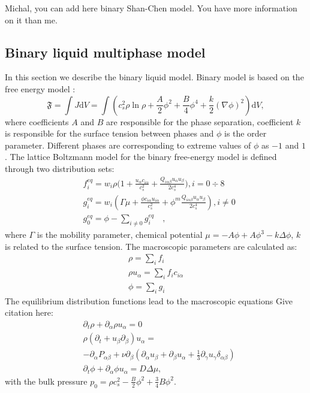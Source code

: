 \documentclass[mathpazo,sort,numbers]{cicp}
\begin{document}
{\color{red} Michal, you can add here binary Shan-Chen model. You have more information on it than me.}

\subsection{Binary liquid multiphase model}
In this section we describe the binary liquid model. Binary model is based on
the free energy model \cite{swift,landau}:
\begin{equation}
\mathfrak{F}=\int{J \mathrm{d}V}=\int{\left(c_s^2\rho\ln\rho+\frac{A}{2}\phi^2+\frac{B}{4}\phi^4 + \frac{k}{2}(\nabla \phi)^2 \right)\mathrm{d}V},
\end{equation}
where coefficients $A$ and $B$ are responsible for the phase separation,
coefficient $k$ is responsible for the surface tension between phases and
$\phi$ is the order parameter. Different phases are corresponding to
extreme values of $\phi$ as $-1$ and $1$.
The lattice Boltzmann model for the binary free-energy model is defined
through two distribution sets:
\begin{equation}
\begin{aligned}
&f_i^{eq}=w_i \rho \biggl(1+\frac{u_{\alpha}c_{i\alpha}}{c_s^2}+\frac{Q_{i\alpha\beta}u_{\alpha}u_{\beta}}{2 c_s^4}\biggr), i=0\div8\\
&g_i^{eq}=w_i(\Gamma \mu + \frac{\phi c_{i\alpha} u_{i\alpha}}{c_s^2}+\phi^m \frac{Q_{i\alpha\beta}u_{\alpha}u_{\beta}}{2 c_s^4}), i\neq0 \\
&g_0^{eq}=\phi-\sum_{i\neq0}{g_i^{eq}}\quad,
\end{aligned}
\end{equation}
where $\Gamma$ is the mobility parameter, chemical potential
$\mu=-A\phi+A\phi^3-k\Delta\phi$, $k$ is related to the surface
tension. The macroscopic parameters are calculated as:
\begin{equation}
\begin{aligned}
\rho=\sum_i{f_i}\\
\rho u_{\alpha}=\sum_i{f_i c_{i\alpha}}\\
\phi=\sum_i{g_i}
\end{aligned}
\end{equation}
The equilibrium distribution functions lead to the macroscopic equations
{\color{red} Give citation here}:
\begin{equation}
\begin{aligned}
&\partial_t \rho+ \partial_{\alpha} \rho u_{\alpha}=0\\
&\rho\left(\partial_t+u_{\beta}\partial_{\beta}\right) u_{\alpha}=\\
&-\partial_{\alpha}P_{\alpha \beta} + \nu\partial_{\beta}\left(\partial_{\alpha}u_{\beta}+\partial_{\beta} u_{\alpha} + \frac{1}{3}\partial_{\gamma} u_{\gamma} \delta_{\alpha\beta}\right)\\
&\partial_t \phi + \partial_{\alpha} \phi u_{\alpha}=D\Delta \mu,
\end{aligned}
\label{binary:fluid:system}
\end{equation}
with the bulk pressure $p_0=\rho c_s^2-\frac{B}{2}\phi^2+\frac{3}{4}B \phi^2$.
\end{document}
